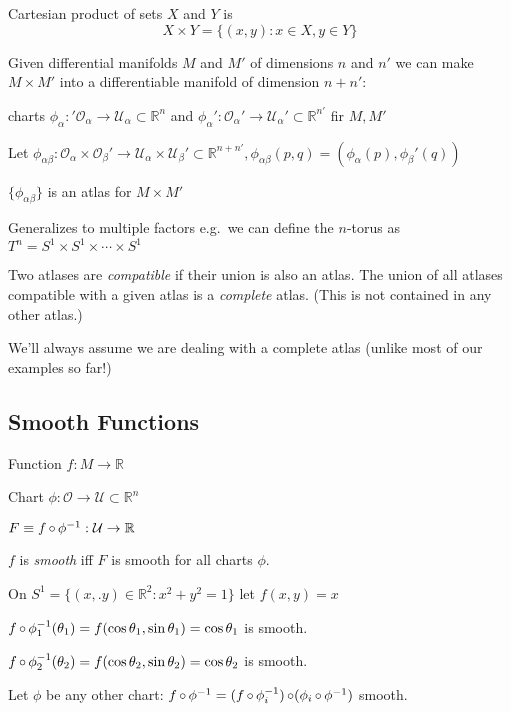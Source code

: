 \documentclass[a4paper,11pt]{article}
\begin{document}
	\begin{ex}
		Cartesian product of sets $X$ and $Y$ is
		\[
			X \times Y = \{(x,y): x\in X, y\in Y\}
		\]
		
		Given differential manifolds $M$ and $M'$ of dimensions $n$ and $n'$ we can make $M \times M'$ into a differentiable manifold of dimension $n + n'$:

		charts $\phi_\alpha: '\mathcal{O}_\alpha \to \mathcal{U}_\alpha \subset \mathbb{R}^n$ and $\phi_\alpha' : \mathcal{O}_\alpha' \to \mathcal{U}_\alpha' \subset \mathbb{R}^{n'}$ fir $M,M'$ 

		Let $\phi_{\alpha\beta}: \mathcal{O}_\alpha \times \mathcal{O}_\beta' \to \mathcal{U}_\alpha \times \mathcal{U}_\beta' \subset \mathbb{R}^{n + n'}, \phi_{\alpha\beta}(p,q) = (\phi_\alpha(p),\phi_\beta'(q))$

		$\{\phi_{\alpha\beta}\}$ is an atlas for $M\times M'$ 

		Generalizes to multiple factors e.g.\ we can define the $n$-torus as $T^n = S^1 \times S^1 \times \cdots \times S^1$ 
	\end{ex}

	\begin{defi}
		Two atlases are \emph{compatible} if their union is also an atlas. The union of all atlases compatible with a given atlas is a \emph{complete} atlas. (This is not contained in any other atlas.)
	\end{defi}

	We'll always assume we are dealing with a complete atlas (unlike most of our examples so far!)

	\subsection{Smooth Functions}
	Function $f: M \to \mathbb{R}$

	Chart $\phi: \mathcal{O} \to \mathcal{U} \subset \mathbb{R}^n$
	
	$F \equiv f \operatorname{\circ} \phi^{-1}: \mathcal{U}\to \mathbb{R}$
	
	\begin{defi}
		$f$ is \emph{smooth} iff $F$ is smooth for all charts $\phi$.
	\end{defi}

	\begin{ex}
		On $S^1 = \{(x,.y) \in \mathbb{R}^2 : x^2+y^2 = 1\}$ let $f(x,y) = x$ 

		$f \operatorname{\circ} \phi_1^{-1}(\theta_1) = f(\cos \theta_1 , \sin \theta_1) = \cos \theta_1$ is smooth.
		
		$f \operatorname{\circ} \phi_2^{-1}(\theta_2) = f(\cos \theta_2 , \sin \theta_2) = \cos \theta_2$ is smooth.

		Let $\phi$ be any other chart: $f \operatorname{\circ} \phi^{-1} = (f \operatorname{\circ} \phi_i^{-1}) \operatorname{\circ} (\phi_i \operatorname{\circ} \phi^{-1})$ smooth.
	\end{ex}
\end{document}
